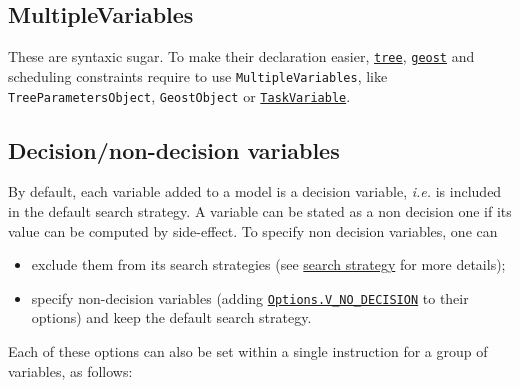 
\subsection{MultipleVariables}\label{model:multiplevariables}\hypertarget{model:multiplevariables}{}
These are syntaxic sugar. To make their declaration easier, \hyperlink{tree:treeconstraint}{\tt tree}, \hyperlink{geost:geostconstraint}{\tt geost} and scheduling constraints require to use {\tt MultipleVariables}, like \texttt{TreeParametersObject}, \texttt{GeostObject} or \hyperlink{taskvariable}{\tt TaskVariable}.



\subsection{Decision/non-decision variables}\label{model:decisionvariables}\hypertarget{model:decisionvariables}{}

By default, each variable added to a model is a decision variable, \textit{i.e.} is included in the default search strategy. A variable can be stated as a non decision one if its value can be computed by side-effect. To specify non decision variables, one can 
\begin{itemize}
\item exclude them from its search strategies (see \hyperlink{solver:searchstrategy}{search strategy} for more details);
\item specify non-decision variables (adding \hyperlink{vnodecision:vnodecisionoptions}{\tt Options.V\_NO\_DECISION} to their options) and keep the default search strategy.
\end{itemize}

Each of these options can also be set within a single instruction for a group of variables, as follows: 


